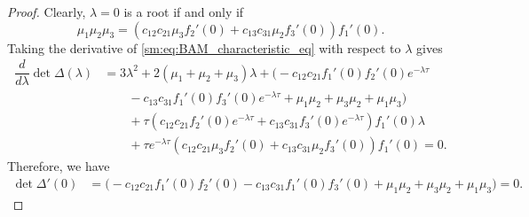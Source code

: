 \begin{proof}
Clearly, $\lambda=0$ is a root if and only if
\[
\mu_{1}\mu_{2}\mu_{3}=\left(c_{12}c_{21}\mu_{3}f_{2}'(0)+c_{13}c_{31}\mu_{2}f_{3}'(0)\right)f_{1}'(0).
\]
Taking the derivative of \cref{sm:eq:BAM_characteristic_eq} with respect
to $\lambda$ gives
\begin{align}
\dfrac{d}{d\lambda}\det\Delta(\lambda) & =3\lambda^{2}+2\left(\mu_{1}+\mu_{2}+\mu_{3}\right)\lambda+\big(-c_{12}c_{21}f_{1}'(0)f_{2}'(0)e^{-\lambda\tau}\nonumber \\
 & \qquad-c_{13}c_{31}f_{1}'(0)f_{3}'(0)e^{-\lambda\tau}+\mu_{1}\mu_{2}+\mu_{3}\mu_{2}+\mu_{1}\mu_{3}\big)\nonumber \\
 & \qquad+\tau\left(c_{12}c_{21}f_{2}'(0)e^{-\lambda\tau}+c_{13}c_{31}f_{3}'(0)e^{-\lambda\tau}\right)f_{1}'(0)\lambda\nonumber \\
 & \qquad+\tau e^{-\lambda\tau}\left(c_{12}c_{21}\mu_{3}f_{2}'(0)+c_{13}c_{31}\mu_{2}f_{3}'(0)\right)f_{1}'(0)=0.\label{sm:eq:BAM_characteristic_eq-derivative}
\end{align}
Therefore, we have
\begin{align*}
    \det\Delta'(0) &= \big(-c_{12}c_{21}f_{1}'(0)f_{2}'(0)-c_{13}c_{31}f_{1}'(0)f_{3}'(0)+\mu_{1}\mu_{2}+\mu_{3}\mu_{2}+\mu_{1}\mu_{3}\big)=0.
\end{align*}


\end{proof}
